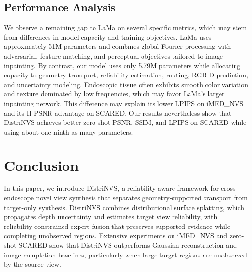 \documentclass[letterpaper,10pt,conference]{ieeeconf}
\begin{document}
\subsection{Performance Analysis}

We observe a remaining gap to LaMa on several specific metrics, which may stem
from differences in model capacity and training objectives. LaMa uses approximately 51M parameters and combines global Fourier processing with adversarial, feature matching, and perceptual objectives tailored to image inpainting.
By contrast, our model uses only 5.79M
parameters while allocating capacity to geometry transport, reliability
estimation, routing, RGB-D prediction, and uncertainty modeling. Endoscopic
tissue often exhibits smooth color variation and texture dominated by low
frequencies, which may favor LaMa's larger inpainting network. This difference may
explain its lower LPIPS on iMED\_NVS and its H-PSNR advantage on SCARED.
Our results nevertheless show that DistriNVS achieves better zero-shot PSNR,
SSIM, and LPIPS on SCARED while using about one ninth as many parameters.

\section{Conclusion}
\label{sec:conclusion}

In this paper, we introduce DistriNVS, a reliability-aware framework for
cross-endoscope novel view synthesis that separates geometry-supported
transport from target-only synthesis. DistriNVS combines distributional surface
splatting, which propagates depth uncertainty and estimates target view
reliability, with reliability-constrained expert fusion that preserves supported
evidence while completing unobserved regions. Extensive experiments on
iMED\_NVS and zero-shot SCARED show that DistriNVS outperforms Gaussian
reconstruction and image completion baselines, particularly when large target
regions are unobserved by the source view.

\balance


\end{document}
